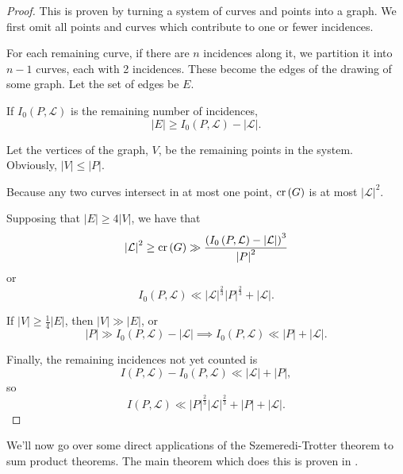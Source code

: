 \documentclass[12pt]{amsart}
\begin{document}
\begin{proof}
This is proven by turning a system of curves and points into a graph. We first omit all points and curves which
contribute to one or fewer incidences. 

For each remaining curve, if there are \(n\) incidences
along it, we partition it into \(n-1\) curves, each with 2 incidences. These become
the edges of the drawing of some graph. Let the set of edges be \(E\).

If \(I_0(P , \mathcal{L} )\) is the remaining number of incidences,
\[
    \left\lvert E \right\rvert \geq  I_0(P , \mathcal{L} ) - \left\lvert \mathcal{L}  \right\rvert 
.\]

Let the vertices of the graph, \(V\), be the remaining points in the system. Obviously, \(\left\lvert V \right\rvert \leq \left\lvert P \right\rvert \).

Because any two curves intersect in at most one point, \(\operatorname{cr}\left( G \right) \) is at most
\(\left\lvert \mathcal{L}  \right\rvert ^{2}\).

Supposing that \(\left\lvert E \right\rvert \geq 4 \left\lvert V \right\rvert \), we have that
\[
    \left\lvert \mathcal{L}  \right\rvert ^{2} \geq \operatorname{cr}\left( G \right) \gg \frac{\left( I_0 \left( P, \mathcal{L}  \right) - \left\lvert \mathcal{L}  \right\rvert \right)  ^{3}  }{\left\lvert P \right\rvert ^{2}} 
\]
or
\[
    I_0(P , \mathcal{L} ) \ll \left\lvert \mathcal{L}  \right\rvert ^{\frac{2}{3} } \left\lvert P \right\rvert ^{\frac{2}{3} } + \left\lvert \mathcal{L}  \right\rvert 
.\]

If \(\left\lvert V \right\rvert \geq \frac{1}{4} \left\lvert E \right\rvert \), then \(\left\lvert V \right\rvert  \gg \left\lvert E \right\rvert \), or
\[
    \left\lvert P \right\rvert \gg I_0\left( P , \mathcal{L}  \right) - \left\lvert \mathcal{L}  \right\rvert \implies I_0(P,\mathcal{L} ) \ll \left\lvert P \right\rvert  + \left\lvert \mathcal{L}  \right\rvert  
.\]

Finally, the remaining incidences not yet counted is 
\[
    I(P, \mathcal{L} ) - I_0 (P , \mathcal{L} ) \ll \left\lvert \mathcal{L} \right\rvert + \left\lvert P \right\rvert
,\]
so
\[
    I(P, \mathcal{L} ) \ll \left\lvert P \right\rvert ^{\frac{2}{3} }\left\lvert \mathcal{L}  \right\rvert ^{\frac{2}{3} } + \left\lvert P \right\rvert + \left\lvert \mathcal{L}  \right\rvert 
.\]
\end{proof}

We'll now go over some direct applications of the Szemeredi-Trotter theorem
to sum product theorems. The main theorem which does this is proven in \cite{elekes}.
\end{document}
